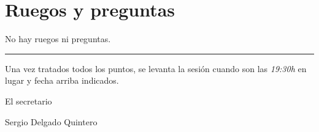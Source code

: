 \documentclass[a4paper, 12pt]{article}
\begin{document}
\section{Ruegos y preguntas}

No hay ruegos ni preguntas.


\vspace{1cm}
\hrule
\vspace{3mm}

Una vez tratados todos los puntos, se levanta la sesión cuando son las \textit{19:30h} en lugar y fecha arriba indicados.

\begin{flushright}
El secretario

Sergio Delgado Quintero
\end{flushright}
\end{document}
